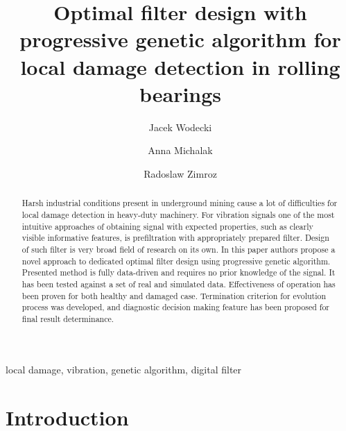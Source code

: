 \documentclass[preprint,12pt]{elsarticle}
\begin{document}
\begin{frontmatter}

\title{Optimal filter design with progressive genetic algorithm for local damage detection in rolling bearings}


\author[label1]{Jacek Wodecki }
\author[label2]{Anna Michalak}
\author[label1]{Radoslaw Zimroz}

\address[label1]{Diagnostics and Vibro-Acoustic Science Laboratory, Wroclaw University of Science and Technology, Na Grobli 15, 50-421 Wroclaw
\\\{jacek.wodecki, radoslaw.zimroz\}@pwr.edu.pl\\}
\address[label2]{KGHM Cuprum Ltd, Research and Development Centre, Sikorskiego 2-8, 53-659 Wroclaw, Poland
\\ amichalak@cuprum.wroc.pl\\}

\begin{abstract}
Harsh industrial conditions present in underground mining cause a lot of difficulties for local damage detection in heavy-duty machinery. For vibration signals one of the most intuitive approaches of obtaining signal with expected properties, such as clearly visible informative features, is prefiltration with appropriately prepared filter. Design of such filter is very broad field of research on its own. In this paper authors propose a novel approach to dedicated optimal filter design using progressive genetic algorithm. Presented method is fully data-driven and requires no prior knowledge of the signal. It has been tested against a set of real and simulated data. Effectiveness of operation has been proven for both healthy and damaged case. Termination criterion for evolution process was developed, and diagnostic decision making feature has been proposed for final result determinance.
\end{abstract}

\begin{keyword}
local damage, vibration, genetic algorithm, digital filter
\end{keyword}

\end{frontmatter}

\linenumbers

\section{Introduction}
\end{document}
